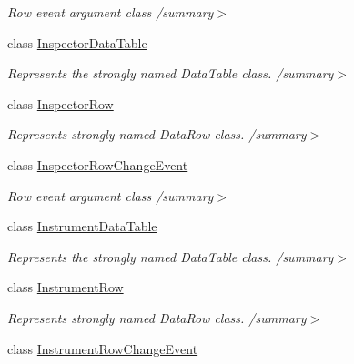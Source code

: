 \begin{DoxyCompactItemize}
\begin{DoxyCompactList}\small\item\em Row event argument class /summary$>$ \end{DoxyCompactList}\item 
class \hyperlink{class_env_int_1_1_win32_1_1_field_tech_1_1_manager_1_1_data_sets_1_1_guide_ware_mobile_data_set_1_1_inspector_data_table}{Inspector\+Data\+Table}
\begin{DoxyCompactList}\small\item\em Represents the strongly named Data\+Table class. /summary$>$ \end{DoxyCompactList}\item 
class \hyperlink{class_env_int_1_1_win32_1_1_field_tech_1_1_manager_1_1_data_sets_1_1_guide_ware_mobile_data_set_1_1_inspector_row}{Inspector\+Row}
\begin{DoxyCompactList}\small\item\em Represents strongly named Data\+Row class. /summary$>$ \end{DoxyCompactList}\item 
class \hyperlink{class_env_int_1_1_win32_1_1_field_tech_1_1_manager_1_1_data_sets_1_1_guide_ware_mobile_data_set_1_1_inspector_row_change_event}{Inspector\+Row\+Change\+Event}
\begin{DoxyCompactList}\small\item\em Row event argument class /summary$>$ \end{DoxyCompactList}\item 
class \hyperlink{class_env_int_1_1_win32_1_1_field_tech_1_1_manager_1_1_data_sets_1_1_guide_ware_mobile_data_set_1_1_instrument_data_table}{Instrument\+Data\+Table}
\begin{DoxyCompactList}\small\item\em Represents the strongly named Data\+Table class. /summary$>$ \end{DoxyCompactList}\item 
class \hyperlink{class_env_int_1_1_win32_1_1_field_tech_1_1_manager_1_1_data_sets_1_1_guide_ware_mobile_data_set_1_1_instrument_row}{Instrument\+Row}
\begin{DoxyCompactList}\small\item\em Represents strongly named Data\+Row class. /summary$>$ \end{DoxyCompactList}\item 
class \hyperlink{class_env_int_1_1_win32_1_1_field_tech_1_1_manager_1_1_data_sets_1_1_guide_ware_mobile_data_set_1_1_instrument_row_change_event}{Instrument\+Row\+Change\+Event}

\end{DoxyCompactItemize}
